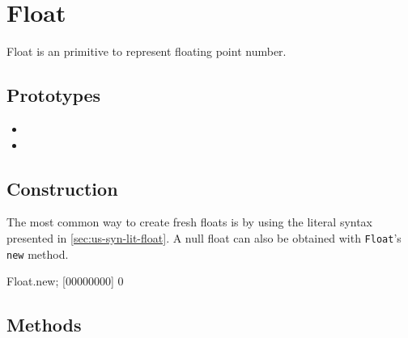 \section{Float}

Float is an \us primitive to represent floating point number.

\subsection{Prototypes}

\begin{itemize}
\item {}
\item {}
\end{itemize}

\subsection{Construction}

The most common way to create fresh floats is by using the literal
syntax presented in \autoref{sec:us-syn-lit-float}. A null float can
also be obtained with \lstinline|Float|'s \lstinline|new| method.

\begin{urbiscript}
Float.new;
[00000000] 0
\end{urbiscript}

\subsection{Methods}

